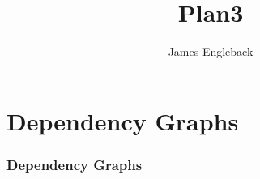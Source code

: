\documentclass[10pt]{beamer}
\title{\textbf{Plan3}}
\author{James Engleback}
\begin{document}
\begin{frame}
\maketitle
\end{frame}

\begin{frame}
	\begin{spacing}{0.00}
	\tiny\tableofcontents
	\end{spacing}
\end{frame}

\section{Dependency Graphs}
\begin{frame}
	\frametitle{\textbf{Dependency Graphs}}


\end{frame}
\end{document}
